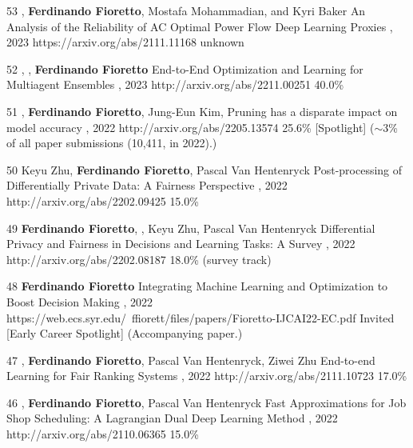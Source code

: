 \begin{pubs}
\confentry
	{53}
	{, {\bf Ferdinando Fioretto}, Mostafa Mohammadian, and Kyri Baker}
	{An Analysis of the Reliability of AC Optimal Power Flow Deep Learning Proxies}
	{, 2023}
	{https://arxiv.org/abs/2111.11168}
	{unknown}

\confentry
    {52} %
	{, , {\bf Ferdinando Fioretto}}
	{End-to-End Optimization and Learning for Multiagent Ensembles}
    {\procAAMAS, 2023}
	{http://arxiv.org/abs/2211.00251}
    {40.0\%}


\confentryAwd
	{51} %
	{, {\bf Ferdinando Fioretto}, Jung-Eun Kim, }
	{Pruning has a disparate impact on model accuracy}
	{\procNeurIPS, 2022}
	{http://arxiv.org/abs/2205.13574}
	{25.6\%}
	{[Spotlight]}
	{($\sim$3\% of all paper submissions (10,411, in 2022).)}

	\confentry
	{50} %
	{Keyu Zhu, {\bf Ferdinando Fioretto}, Pascal Van Hentenryck}
	{Post-processing of Differentially Private Data: A Fairness Perspective}
	{\procIJCAI, 2022}
	{http://arxiv.org/abs/2202.09425}	
	{15.0\%}

	\confentry
	{49} %
	{{\bf Ferdinando Fioretto}, , Keyu Zhu, Pascal Van Hentenryck}
	{Differential Privacy and Fairness in Decisions and Learning Tasks: A Survey}
	{\procIJCAI, 2022}
	{http://arxiv.org/abs/2202.08187}	
	{18.0\% (survey track)}

	\confentryAwd
	{48} %
	{{\bf Ferdinando Fioretto}}
	{Integrating Machine Learning and Optimization to Boost Decision Making}
	{\procIJCAI, 2022}
	{https://web.ecs.syr.edu/~ffiorett/files/papers/Fioretto-IJCAI22-EC.pdf}	
	{Invited}
	{[Early Career Spotlight]}
	{(Accompanying paper.)}

	\confentry
	{47} %
	{, {\bf Ferdinando Fioretto}, Pascal Van Hentenryck, Ziwei Zhu}
	{End-to-end Learning for Fair Ranking Systems}
	{\procWWW, 2022}
	{http://arxiv.org/abs/2111.10723}	
	{17.0\%}
	
	\confentry
	{46} %
	{, {\bf Ferdinando Fioretto}, Pascal Van Hentenryck}
	{Fast Approximations for Job Shop Scheduling: A Lagrangian Dual Deep Learning Method}
	{\procAAAI, 2022}
	{http://arxiv.org/abs/2110.06365}
	{15.0\%}


\end{pubs}
